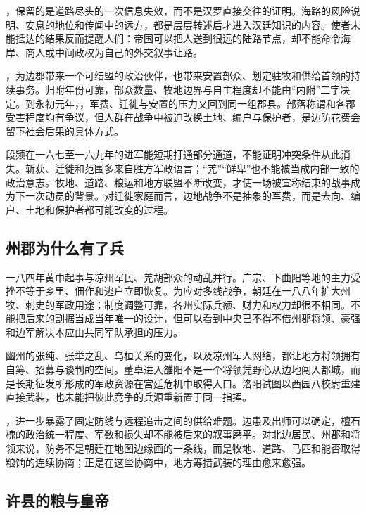 ，保留的是道路尽头的一次信息失效，而不是汉罗直接交往的证明。海路的风险说明、安息的地位和传闻中的远方，都是层层转述后才进入汉廷知识的内容。使者未能抵达的结果反而提醒人们：帝国可以把人送到很远的陆路节点，却不能命令海岸、商人或中间政权为自己的外交叙事让路。

，为边郡带来一个可结盟的政治伙伴，也带来安置部众、划定驻牧和供给首领的持续事务。归附年份可靠，部众数量、牧地边界与自主程度却不能由“内附”二字决定。到永初元年，，军费、迁徙与安置的压力又回到同一组郡县。部落称谓和各郡受害程度均有争议，但人群在战争中被迫改换土地、编户与保护者，是边防花费会留下社会后果的具体方式。

段颎在一六七至一六九年的进军能短期打通部分通道，不能证明冲突条件从此消失。斩获、迁徙和范围多来自胜方军政语言；“羌”“鲜卑”也不能被当成内部一致的政治意志。牧地、道路、粮运和地方联盟不断改变，才使一场被宣称结束的战事成为下一次动员的背景。对迁徙家庭而言，边地战争不是抽象的军费，而是去向、编户、土地和保护者都可能改变的过程。

\subsection{州郡为什么有了兵}

一八四年黄巾起事与凉州军民、羌胡部众的动乱并行。广宗、下曲阳等地的主力受挫不等于乡里、佃作和逃户立即恢复。为应对多线战争，朝廷在一八八年扩大州牧、刺史的军政用途；制度调整可靠，各州实际兵额、财力和权力却很不相同。不能把后来的割据当成当年唯一的设计，但可以看到中央已不得不借州郡将领、豪强和边军解决本应由共同军队承担的压力。

幽州的张纯、张举之乱、乌桓关系的变化，以及凉州军人网络，都让地方将领拥有自筹、招募与谈判的空间。董卓进入雒阳不是一个将领凭野心从边地闯入都城，而是长期征发所形成的军政资源在宫廷危机中取得入口。洛阳试图以西园八校尉重建直接武装，也未能把彼此竞争的兵源重新置于同一指挥。

，进一步暴露了固定防线与远程追击之间的供给难题。边患及出师可以确定，檀石槐的政治统一程度、军数和损失却不能被后来的叙事磨平。对北边居民、州郡和将领来说，防务不是朝廷在地图边缘画的一条线，而是牧地、道路、马匹和能否取得粮饷的连续协商；正是在这些协商中，地方筹措武装的理由愈来愈强。

\subsection{许县的粮与皇帝}

